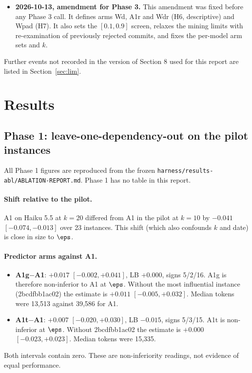 \begin{itemize}
\item \textbf{2026-10-13, amendment for Phase 3.} This amendment was fixed before any Phase 3 call. It defines arms Wd, A1r and Wdr (H6, descriptive) and Wpad (H7). It also sets the $[0.1, 0.9]$ screen, relaxes the mining limits with re-examination of previously rejected commits, and fixes the per-model arm sets and $k$.
\end{itemize}

Further events not recorded in the version of Section 8 used for this report are listed in Section~\ref{sec:lim}.

\section{Results}



\subsection{Phase 1: leave-one-dependency-out on the pilot instances}

All Phase 1 figures are reproduced from the frozen \texttt{harness/results-abl/ABLATION-REPORT.md}. Phase 1 has no table in this report.

\paragraph{Shift relative to the pilot.} A1 on Haiku 5.5 at $k=20$ differed from A1 in the pilot at $k=10$ by $-0.041$ $[-0.074, -0.013]$ over 23 instances. This shift (which also confounds $k$ and date) is close in size to $\eps$.

\paragraph{Predictor arms against A1.}
\begin{itemize}
\item \textbf{A1g$-$A1}: $+0.017$ $[-0.002, +0.041]$, LB $+0.000$, signs 5/2/16. A1g is therefore non-inferior to A1 at $\eps$. Without the most influential instance (2bcdfbb1ac02) the estimate is $+0.011$ $[-0.005, +0.032]$. Median tokens were 13,513 against 39,586 for A1.
\item \textbf{A1t$-$A1}: $+0.007$ $[-0.020, +0.030]$, LB $-0.015$, signs 5/3/15. A1t is non-inferior at $\eps$. Without 2bcdfbb1ac02 the estimate is $+0.000$ $[-0.023, +0.023]$. Median tokens were 15,335.
\end{itemize}
Both intervals contain zero. These are non-inferiority readings, not evidence of equal performance.

